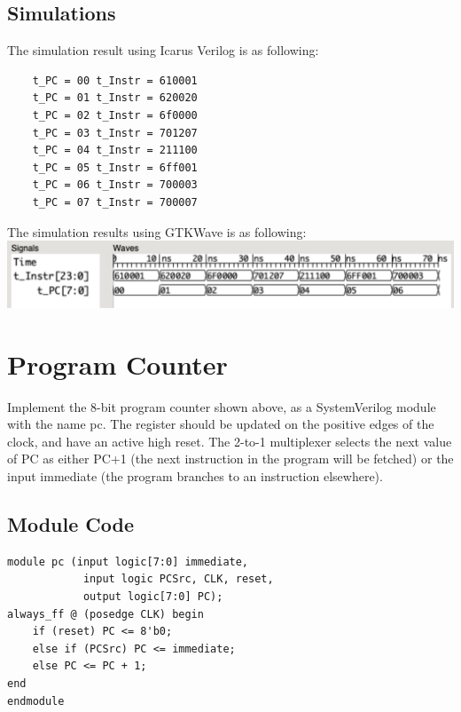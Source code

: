 \documentclass{article}
\begin{document}
\subsection{Simulations}
The simulation result using Icarus Verilog is as following:
\begin{Verbatim}
    t_PC = 00 t_Instr = 610001
    t_PC = 01 t_Instr = 620020
    t_PC = 02 t_Instr = 6f0000
    t_PC = 03 t_Instr = 701207
    t_PC = 04 t_Instr = 211100
    t_PC = 05 t_Instr = 6ff001
    t_PC = 06 t_Instr = 700003
    t_PC = 07 t_Instr = 700007
\end{Verbatim}
The simulation results using GTKWave is as following:\vspace{5pt}\\
\includegraphics[width=\textwidth]{instruction_memory.png}

\newpage
\section{Program Counter}
Implement the 8-bit program counter shown above, as a SystemVerilog module with the name pc. The register should be updated on the positive edges of the clock, and have an active high reset. The 2-to-1 multiplexer selects the next value of PC as either PC+1 (the next instruction in the program will be fetched) or the input immediate (the program branches to an instruction elsewhere).

\subsection{Module Code}
\begin{lstlisting}
module pc (input logic[7:0] immediate, 
            input logic PCSrc, CLK, reset,
            output logic[7:0] PC);
always_ff @ (posedge CLK) begin
    if (reset) PC <= 8'b0; 
    else if (PCSrc) PC <= immediate;
    else PC <= PC + 1; 
end
endmodule
\end{lstlisting}
\end{document}
